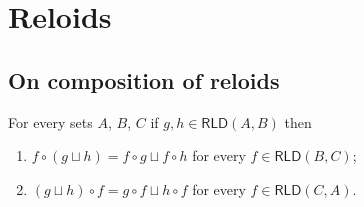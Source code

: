 \chapter{Reloids}

\section{On composition of reloids}

\begin{thm}
For every sets $A$, $B$, $C$ if $g,h\in\mathsf{RLD}(A,B)$ then
\begin{enumerate}
\item $f\circ(g\sqcup h)=f\circ g\sqcup f\circ h$ for every $f\in\mathsf{RLD}(B,C)$;
\item $(g\sqcup h)\circ f=g\circ f\sqcup h\circ f$ for every $f\in\mathsf{RLD}(C,A)$.
\end{enumerate}
\end{thm}
